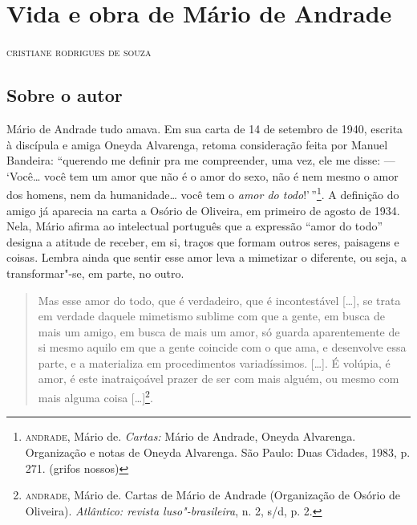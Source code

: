 \chapter{Vida e obra de Mário de Andrade}

\begin{flushright}
\textsc{cristiane rodrigues de souza}
\end{flushright}
\bigskip

\section{Sobre o autor}

\noindent{}Mário de Andrade tudo amava. Em sua carta de 14 de setembro de
1940, escrita à discípula e amiga Oneyda Alvarenga, retoma consideração
feita por Manuel Bandeira: ``querendo me definir pra me
compreender, uma vez, ele me disse: --- `Você\ldots{} você tem um amor que não é o
amor do sexo, não é nem mesmo o amor dos homens, nem da humanidade\ldots{}
você tem o \emph{amor do todo}!'\,''\footnote{\textsc{andrade}, Mário de.
  \emph{Cartas:} Mário de Andrade, Oneyda Alvarenga. Organização
  e notas de Oneyda Alvarenga. São Paulo: Duas Cidades, 1983, p. 271.
  (grifos nossos)}. A definição do amigo já aparecia na carta a Osório
de Oliveira, em primeiro de agosto de 1934. Nela, Mário afirma
ao intelectual português que a expressão ``amor do todo'' designa a
atitude de receber, em si, traços que formam outros seres, paisagens e
coisas. Lembra ainda que sentir esse amor leva a mimetizar o diferente,
ou seja, a transformar"-se, em parte, no outro.

\begin{quote}
Mas esse amor do todo, que é verdadeiro, que é incontestável {[}\ldots{}{]},
se trata em verdade daquele mimetismo sublime com que a gente, em busca
de mais um amigo, em busca de mais um amor, só guarda aparentemente de
si mesmo aquilo em que a gente coincide com o que ama, e desenvolve essa
parte, e a materializa em procedimentos variadíssimos. {[}\ldots{}{]}. É
volúpia, é amor, é este inatraiçoável prazer de ser com mais alguém, ou
mesmo com mais alguma coisa {[}\ldots{}{]}\footnote{\textsc{andrade}, Mário de. Cartas de Mário de Andrade (Organização de Osório de Oliveira).
  \emph{Atlântico: revista luso"-brasileira}, n. 2, s/d, p. 2.}.
\end{quote}

